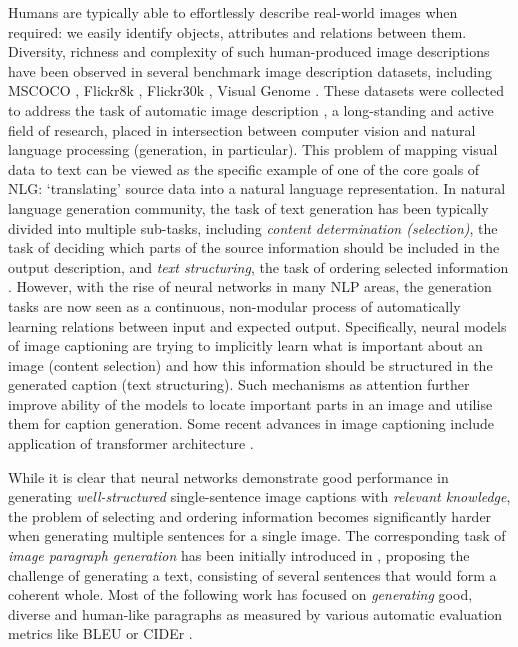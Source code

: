 \documentclass[11pt,a4paper]{article}
\begin{document}
\iffalse
Humans are typically able to effortlessly describe real-world images when required: we easily identify objects, attributes and relations between them.
Diversity, richness and complexity of such human-produced image descriptions have been observed in several benchmark image description datasets, including MSCOCO \cite{lin2014microsoft,chen2015microsoft}, Flickr8k \cite{hodosh2013}, Flickr30k \cite{young-etal-2014-image}, Visual Genome \cite{krishnavisualgenome}.
These datasets were collected to address the task of automatic image description \cite{bernardi2016automatic}, a long-standing and active field of research, placed in intersection between computer vision and natural language processing (generation, in particular).
This problem of mapping visual data to text can be viewed as the specific example of one of the core goals of NLG: `translating' source data into a natural language representation.
In natural language generation community, the task of text generation has been typically divided into multiple sub-tasks, including \textit{content determination (selection)}, the task of deciding which parts of the source information should be included in the output description, and \textit{text structuring}, the task of ordering selected information \cite{Gatt2017}.
However, with the rise of neural networks in many NLP areas, the generation tasks are now seen as a continuous, non-modular process of automatically learning relations between input and expected output. Specifically, neural models of image captioning \cite{kiros14,vinyals2014tell} are trying to implicitly learn what is important about an image (content selection) and how this information should be structured in the generated caption (text structuring).
Such mechanisms as attention \cite{xu2015attend,anderson2017bottomup} further improve ability of the models to locate important parts in an image and utilise them for caption generation. Some recent advances in image captioning include application of transformer architecture \cite{vaswani2017attention,herdade2019image}.


While it is clear that neural networks demonstrate good performance in generating \textit{well-structured} single-sentence image captions with \textit{relevant knowledge}, the problem of selecting and ordering information becomes significantly harder when generating multiple sentences for a single image. The corresponding task of
\textit{image paragraph generation} has been initially introduced in , proposing the challenge of generating a text, consisting of several sentences that would form a coherent whole.
Most of the following work \cite{liang2017recurrent,chatterjee2018diverse,wang2019convolutional} has focused on \textit{generating} good, diverse and human-like paragraphs as measured by various automatic evaluation metrics like BLEU \cite{bleu} or CIDEr \cite{vedantam2014cider}.
\end{document}
